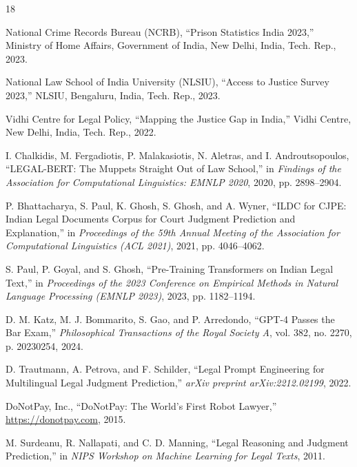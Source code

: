 \documentclass[conference]{IEEEtran}
\begin{document}
\begin{thebibliography}{18}

National Crime Records Bureau (NCRB), ``Prison Statistics India 2023,'' Ministry of Home Affairs, Government of India, New Delhi, India, Tech. Rep., 2023.

National Law School of India University (NLSIU), ``Access to Justice Survey 2023,'' NLSIU, Bengaluru, India, Tech. Rep., 2023.

Vidhi Centre for Legal Policy, ``Mapping the Justice Gap in India,'' Vidhi Centre, New Delhi, India, Tech. Rep., 2022.

I. Chalkidis, M. Fergadiotis, P. Malakasiotis, N. Aletras, and I. Androutsopoulos, ``LEGAL-BERT: The Muppets Straight Out of Law School,'' in \emph{Findings of the Association for Computational Linguistics: EMNLP 2020}, 2020, pp. 2898--2904.

P. Bhattacharya, S. Paul, K. Ghosh, S. Ghosh, and A. Wyner, ``ILDC for CJPE: Indian Legal Documents Corpus for Court Judgment Prediction and Explanation,'' in \emph{Proceedings of the 59th Annual Meeting of the Association for Computational Linguistics (ACL 2021)}, 2021, pp. 4046--4062.

S. Paul, P. Goyal, and S. Ghosh, ``Pre-Training Transformers on Indian Legal Text,'' in \emph{Proceedings of the 2023 Conference on Empirical Methods in Natural Language Processing (EMNLP 2023)}, 2023, pp. 1182--1194.

D. M. Katz, M. J. Bommarito, S. Gao, and P. Arredondo, ``GPT-4 Passes the Bar Exam,'' \emph{Philosophical Transactions of the Royal Society A}, vol. 382, no. 2270, p. 20230254, 2024.

D. Trautmann, A. Petrova, and F. Schilder, ``Legal Prompt Engineering for Multilingual Legal Judgment Prediction,'' \emph{arXiv preprint arXiv:2212.02199}, 2022.

DoNotPay, Inc., ``DoNotPay: The World's First Robot Lawyer,'' \url{https://donotpay.com}, 2015.

M. Surdeanu, R. Nallapati, and C. D. Manning, ``Legal Reasoning and Judgment Prediction,'' in \emph{NIPS Workshop on Machine Learning for Legal Texts}, 2011.


\end{thebibliography}
\end{document}
